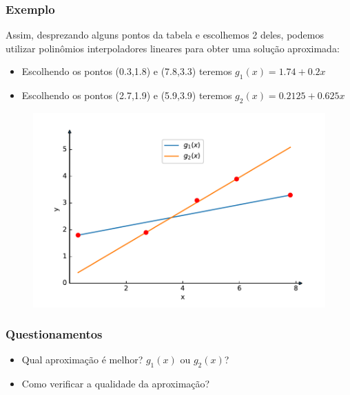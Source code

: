 \documentclass{beamer}
\theoremstyle{mystyle}
\begin{document}
	\begin{frame}
		\frametitle{Exemplo}
		Assim, desprezando alguns pontos da tabela e escolhemos 2 deles, podemos utilizar polinômios interpoladores lineares para obter uma solução aproximada:
		\begin{itemize}
			\item  Escolhendo os pontos (0.3,1.8) e (7.8,3.3) teremos $ g_{1}(x) =  1.74 + 0.2x $ 
			\item  Escolhendo os pontos (2.7,1.9) e (5.9,3.9) teremos $ g_{2}(x) =  0.2125 + 0.625x $
		\end{itemize}
		\begin{figure}
			\centering
			\includegraphics[width=0.6\linewidth]{Figuras/grafico_03}
			\label{fig:grafico03}
		\end{figure}	
	\end{frame}
	
	\begin{frame}
		\frametitle{Questionamentos}
		\begin{itemize}
			\item  Qual aproximação é melhor? $ g_{1} (x) $ ou $ g_{2} (x) $?
			\item  Como verificar a qualidade da aproximação?			
		\end{itemize}
	\end{frame}
	
\end{document}
